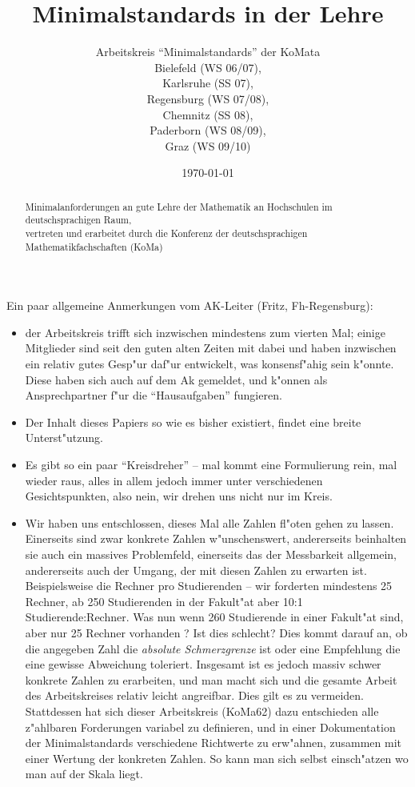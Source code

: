 \documentclass[10pt,twoside,a5paper,pdftex]{article}
\title{Minimalstandards in der Lehre}
\author{Arbeitskreis "`Minimalstandards"' der KoMata \\
Bielefeld (WS 06/07), \\
Karlsruhe (SS 07),  \\
Regensburg (WS 07/08), \\
Chemnitz (SS 08), \\
Paderborn (WS 08/09),\\
Graz (WS 09/10)}
\date{\today}
\newenvironment{komacmt62}{%
\marginpar{\framebox{62}} %
\begin{center}\begin{minipage}{.8\textwidth}\normalfont \mdseries \sffamily \small \color{grau} }{\end{minipage}\end{center} %
}
\begin{document}
\maketitle

\begin{abstract}
\begin{center}
	Minimalanforderungen an gute Lehre der Mathematik
	an Hochschulen im deutschsprachigen Raum,\\
	 vertreten und
	erarbeitet durch die Konferenz der deutschsprachigen Mathematikfachschaften (KoMa)
\end{center}
\end{abstract}


\tableofcontents

\setlength{\parskip}{1.5ex}

\begin{kcmt62}
\begin{komacmt62}
Ein paar allgemeine Anmerkungen vom AK-Leiter (Fritz, Fh-Regensburg):
\begin{itemize}
\item der Arbeitskreis trifft sich inzwischen mindestens zum vierten Mal; einige
 Mitglieder sind seit den guten alten Zeiten mit dabei und haben inzwischen ein
 relativ gutes Gesp"ur daf"ur entwickelt, was konsensf"ahig sein k"onnte. Diese
 haben sich auch auf dem Ak gemeldet, und k"onnen als Ansprechpartner f"ur die
 "`Hausaufgaben"' fungieren.
\item Der Inhalt dieses Papiers so wie es bisher existiert, findet eine breite
 Unterst"utzung.
\item Es gibt so ein paar "`Kreisdreher"' -- mal kommt eine Formulierung rein, mal
 wieder raus, alles in allem jedoch immer unter verschiedenen Gesichtspunkten,
 also nein, wir drehen uns nicht nur im Kreis.
\item Wir haben uns entschlossen, dieses Mal alle Zahlen fl"oten gehen zu lassen.
 Einerseits sind zwar konkrete Zahlen w"unschenswert, andererseits beinhalten sie
 auch ein massives Problemfeld, einerseits das der Messbarkeit allgemein, andererseits
 auch der Umgang, der mit diesen Zahlen zu erwarten ist. Beispielsweise die Rechner
 pro Studierenden -- wir forderten mindestens 25 Rechner, ab 250 Studierenden in
 der Fakult"at aber 10:1 Studierende:Rechner. Was nun wenn 260 Studierende in einer
 Fakult"at sind, aber nur 25 Rechner vorhanden ? Ist dies schlecht? Dies kommt darauf
 an, ob die angegeben Zahl die \emph{absolute Schmerzgrenze} ist oder eine Empfehlung
 die eine gewisse Abweichung toleriert. Insgesamt ist es jedoch massiv schwer konkrete
 Zahlen zu erarbeiten, und man macht sich und die gesamte Arbeit des Arbeitskreises
 relativ leicht angreifbar. Dies gilt es zu vermeiden. Stattdessen hat sich dieser
 Arbeitskreis (KoMa62) dazu entschieden alle z"ahlbaren Forderungen variabel zu
 definieren, und in einer Dokumentation der Minimalstandards verschiedene Richtwerte
 zu erw"ahnen, zusammen mit einer Wertung der konkreten Zahlen. So kann man sich
 selbst einsch"atzen wo man auf der Skala liegt.
\end{itemize}
\end{komacmt62}
\end{kcmt62}

\newpage


\newpage




\newpage


\newpage


\newpage

\end{document}
